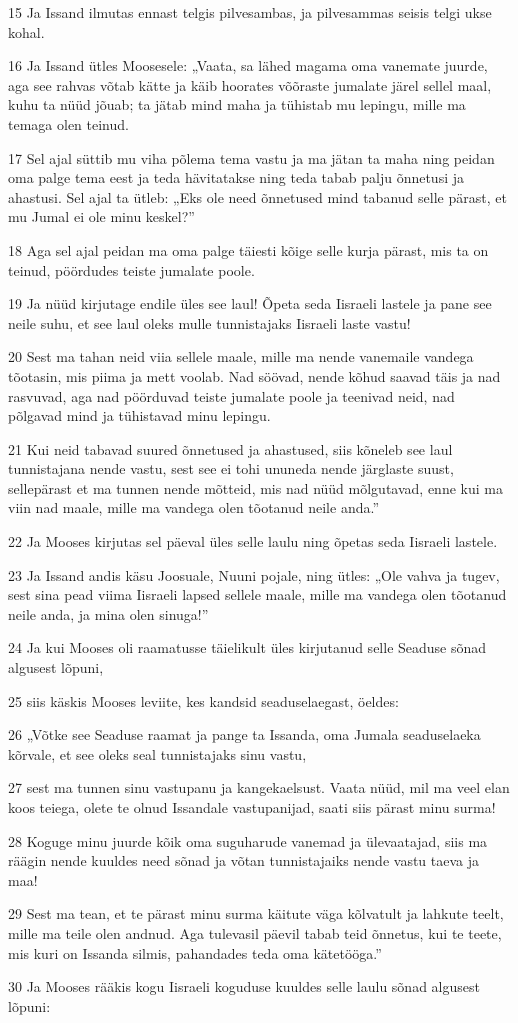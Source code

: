 \par 15 Ja Issand ilmutas ennast telgis pilvesambas, ja pilvesammas seisis telgi ukse kohal.
\par 16 Ja Issand ütles Moosesele: „Vaata, sa lähed magama oma vanemate juurde, aga see rahvas võtab kätte ja käib hoorates võõraste jumalate järel sellel maal, kuhu ta nüüd jõuab; ta jätab mind maha ja tühistab mu lepingu, mille ma temaga olen teinud.
\par 17 Sel ajal süttib mu viha põlema tema vastu ja ma jätan ta maha ning peidan oma palge tema eest ja teda hävitatakse ning teda tabab palju õnnetusi ja ahastusi. Sel ajal ta ütleb: „Eks ole need õnnetused mind tabanud selle pärast, et mu Jumal ei ole minu keskel?”
\par 18 Aga sel ajal peidan ma oma palge täiesti kõige selle kurja pärast, mis ta on teinud, pöördudes teiste jumalate poole.
\par 19 Ja nüüd kirjutage endile üles see laul! Õpeta seda Iisraeli lastele ja pane see neile suhu, et see laul oleks mulle tunnistajaks Iisraeli laste vastu!
\par 20 Sest ma tahan neid viia sellele maale, mille ma nende vanemaile vandega tõotasin, mis piima ja mett voolab. Nad söövad, nende kõhud saavad täis ja nad rasvuvad, aga nad pöörduvad teiste jumalate poole ja teenivad neid, nad põlgavad mind ja tühistavad minu lepingu.
\par 21 Kui neid tabavad suured õnnetused ja ahastused, siis kõneleb see laul tunnistajana nende vastu, sest see ei tohi ununeda nende järglaste suust, sellepärast et ma tunnen nende mõtteid, mis nad nüüd mõlgutavad, enne kui ma viin nad maale, mille ma vandega olen tõotanud neile anda.”
\par 22 Ja Mooses kirjutas sel päeval üles selle laulu ning õpetas seda Iisraeli lastele.
\par 23 Ja Issand andis käsu Joosuale, Nuuni pojale, ning ütles: „Ole vahva ja tugev, sest sina pead viima Iisraeli lapsed sellele maale, mille ma vandega olen tõotanud neile anda, ja mina olen sinuga!”
\par 24 Ja kui Mooses oli raamatusse täielikult üles kirjutanud selle Seaduse sõnad algusest lõpuni,
\par 25 siis käskis Mooses leviite, kes kandsid seaduselaegast, öeldes:
\par 26 „Võtke see Seaduse raamat ja pange ta Issanda, oma Jumala seaduselaeka kõrvale, et see oleks seal tunnistajaks sinu vastu,
\par 27 sest ma tunnen sinu vastupanu ja kangekaelsust. Vaata nüüd, mil ma veel elan koos teiega, olete te olnud Issandale vastupanijad, saati siis pärast minu surma!
\par 28 Koguge minu juurde kõik oma suguharude vanemad ja ülevaatajad, siis ma räägin nende kuuldes need sõnad ja võtan tunnistajaiks nende vastu taeva ja maa!
\par 29 Sest ma tean, et te pärast minu surma käitute väga kõlvatult ja lahkute teelt, mille ma teile olen andnud. Aga tulevasil päevil tabab teid õnnetus, kui te teete, mis kuri on Issanda silmis, pahandades teda oma kätetööga.”
\par 30 Ja Mooses rääkis kogu Iisraeli koguduse kuuldes selle laulu sõnad algusest lõpuni:

